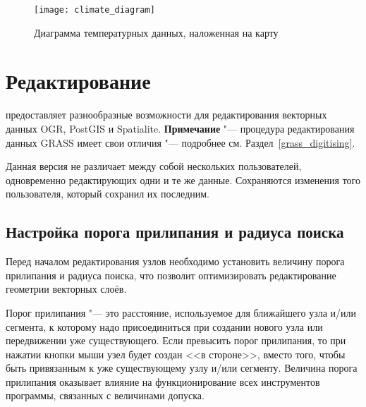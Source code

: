 \begin{figure}[ht]
   \centering
   \texttt{[image: climate\_diagram]}
   \caption{Диаграмма температурных данных, наложенная на карту \wincaption}\label{fig:climatediagram}
\end{figure}

\section{Редактирование}

\qg предоставляет разнообразные возможности для редактирования векторных
данных OGR, PostGIS и Spatialite. \textbf{Примечание} "--- процедура
редактирования данных GRASS имеет свои отличия "--- подробнее см.
Раздел~\ref{grass_digitising}.

\begin{Tip}\caption{\textsc{Параллельное редактирование}}
Данная версия \qg не различает между собой нескольких пользователей,
одновременно редактирующих одни и те же данные. Сохраняются изменения
того пользователя, который сохранил их последним.
\end{Tip}

\subsection{Настройка порога прилипания и радиуса поиска}\label{snapping_tolerance}

Перед началом редактирования узлов необходимо установить величину порога
прилипания и радиуса поиска, что позволит оптимизировать редактирование
геометрии векторных слоёв.


Порог прилипания "--- это расстояние, используемое \qg для 
ближайшего узла и/или сегмента, к которому надо присоединиться при создании
нового узла или передвижении уже существующего. Если превысить порог
прилипания, то при нажатии кнопки мыши узел будет создан <<в стороне>>,
вместо того, чтобы быть привязанным к уже существующему узлу и/или сегменту.
Величина порога прилипания оказывает влияние на функционирование всех
инструментов программы, связанных с величинами допуска.

